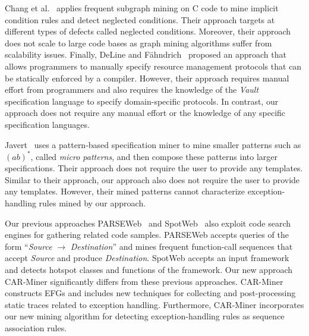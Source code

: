 Chang et al.~\cite{chang07:finding} applies frequent subgraph mining on C code
to mine implicit condition rules and detect neglected conditions.
Their approach targets at different types of defects called neglected conditions.
Moreover, their approach does not scale to large code bases as graph mining algorithms
suffer from scalability issues. Finally, DeLine and F\"{a}hndrich~\cite{deline:high-level} proposed an approach 
that allows programmers to manually specify resource management protocols
that can be statically enforced by a compiler. However, their approach requires manual
effort from programmers and also requires the knowledge of the \emph{Vault} specification
language to specify domain-specific protocols. In contrast, our approach 
does not require any manual effort or the knowledge of any specific specification languages.

Javert~\cite{gabel:javert} uses a pattern-based specification
miner to mine smaller patterns such as $(ab)^*$, called \emph{micro patterns},
and then compose these patterns into larger specifications. Their approach does not
require the user to provide any templates. Similar to their approach, our approach
also does not require the user to provide any templates. 
However, their mined patterns cannot characterize exception-handling rules
mined by our approach.

Our previous approaches PARSEWeb~\cite{thummalapenta07:parseweb} 
and SpotWeb~\cite{thummalapenta08:spotweb} also exploit code search engines for gathering related code samples. 
PARSEWeb accepts queries of the form ``\emph{Source} $\rightarrow$ \emph{Destination}'' 
and mines frequent function-call sequences that accept
\emph{Source} and produce \emph{Destination}. SpotWeb accepts an input framework
and detects hotspot classes and functions of the framework. Our new approach CAR-Miner
significantly differs from these previous approaches.
CAR-Miner constructs EFGs and includes new techniques for
collecting and post-processing static traces related to exception handling. Furthermore, CAR-Miner 
incorporates our new mining algorithm for detecting exception-handling rules
as sequence association rules.

 
